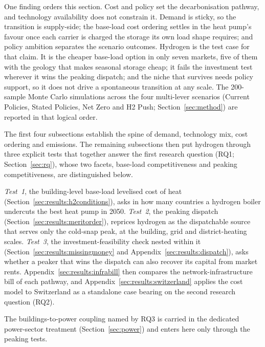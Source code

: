 \label{sec:results}

One finding orders this section. Cost and policy set the decarbonisation pathway, and
technology availability does not constrain it. Demand is sticky, so the
transition is supply-side; the base-load cost ordering settles in the heat
pump's favour once each carrier is charged the storage its own load shape
requires; and policy ambition separates the scenario outcomes. Hydrogen is the
test case for that claim. It is the cheaper base-load option in only seven
markets, five of them with the geology that makes seasonal storage cheap; it fails the
investment test wherever it wins the peaking dispatch; and the niche that survives needs
policy support, so it does not drive a spontaneous transition at any scale. The 200-sample Monte Carlo simulations across the four multi-lever
scenarios (Current Policies, Stated Policies, Net Zero and H2 Push;
Section~\ref{sec:method}) are reported in that logical order.

The first four subsections establish the spine of demand, technology mix, cost
ordering and emissions. The remaining subsections then put hydrogen through three
explicit tests that together answer the first research question (RQ1;
Section~\ref{sec:rq}), whose two facets, base-load competitiveness and peaking
competitiveness, are distinguished below.

\emph{Test~1}, the building-level base-load levelised cost of heat
(Section~\ref{sec:results:h2conditions}), asks in how many countries a hydrogen boiler
undercuts the best heat pump in 2050. \emph{Test~2}, the peaking dispatch
(Section~\ref{sec:results:meritorder}), reprices hydrogen as the dispatchable source
that serves only the cold-snap peak, at the building, grid and district-heating scales.
\emph{Test~3}, the investment-feasibility check nested within it
(Section~\ref{sec:results:missingmoney} and Appendix~\ref{sec:results:dispatch}), asks whether a
peaker that wins the dispatch can also recover its capital from market rents.
Appendix~\ref{sec:results:infrabill} then compares the network-infrastructure bill of
each pathway, and Appendix~\ref{sec:results:switzerland} applies the cost model to
Switzerland as a standalone case bearing on the second research question (RQ2).

The buildings-to-power coupling named by RQ3 is carried in the dedicated
power-sector treatment (Section~\ref{sec:power}) and enters here only through the
peaking tests.

